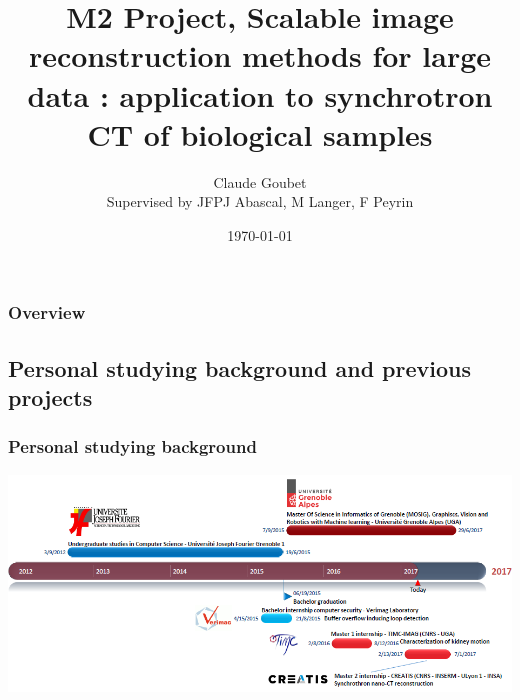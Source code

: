 \documentclass{beamer}
\title[Master 2 presentation]{M2 Project, Scalable image reconstruction methods for large data : application to 
synchrotron CT of biological
samples} %
\author{Claude Goubet\\ Supervised by JFPJ Abascal, M Langer, F Peyrin} %
\institute[UGA] %
{
Université Grenoble Alpes \\ %
\medskip
\textit{claude.goubet@etu.univ-grenoble-alpes.fr} %
}
\date{\today} %
\begin{document}
\nobibliography{\jobname}

\begin{frame}
\titlepage %
\end{frame}

\begin{frame}
\frametitle{Overview} %
\tableofcontents %
\end{frame}



\begin{frame}
\section{Personal studying background and previous projects}
\frametitle{Personal studying background}

\includegraphics[width=\textwidth]{FriseEtudes.png}

\end{frame}

\end{document}
